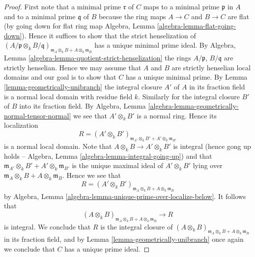 \documentclass[10pt,a4paper]{amsart}
\theoremstyle{plain}
\theoremstyle{definition}
\theoremstyle{remark}
\numberwithin{equation}{subsection}
\begin{document}
\begin{proof}
First note that a minimal prime $\mathfrak r$ of $C$ maps to a minimal
prime $\mathfrak p$ in $A$ and to a minimal prime $\mathfrak q$ of $B$
because the ring maps $A \to C$ and $B \to C$ are flat (by going down for
flat ring map Algebra, Lemma \ref{algebra-lemma-flat-going-down}).
Hence it suffices to show that the strict henselization of
$(A/\mathfrak p \otimes_k B/\mathfrak q)_{
\mathfrak m_A \otimes_k B + A \otimes_k \mathfrak m_B}$
has a unique minimal prime ideal. By
Algebra, Lemma \ref{algebra-lemma-quotient-strict-henselization}
the rings $A/\mathfrak p$, $B/\mathfrak q$ are strictly henselian.
Hence we may assume that $A$ and $B$ are strictly henselian
local domains and our goal is to show that $C$ has a unique minimal prime.
By Lemma \ref{lemma-geometrically-unibranch} the
integral closure $A'$ of $A$ in its fraction field
is a normal local domain with residue field $k$. Similarly for the
integral closure $B'$ of $B$ into its fraction field. By
Algebra, Lemma \ref{algebra-lemma-geometrically-normal-tensor-normal}
we see that $A' \otimes_k B'$ is a normal ring. Hence its localization
$$
R = (A' \otimes_k B')_{
\mathfrak m_{A'} \otimes_k B' + A' \otimes_k \mathfrak m_{B'}}
$$
is a normal local domain. Note that $A \otimes_k B \to A' \otimes_k B'$
is integral (hence gong up holds --
Algebra, Lemma \ref{algebra-lemma-integral-going-up})
and that $\mathfrak m_{A'} \otimes_k B' + A' \otimes_k \mathfrak m_{B'}$
is the unique maximal ideal of $A' \otimes_k B'$
lying over $\mathfrak m_A \otimes_k B + A \otimes_k \mathfrak m_B$.
Hence we see that
$$
R = (A' \otimes_k B')_{
\mathfrak m_A \otimes_k B + A \otimes_k \mathfrak m_B}
$$
by
Algebra, Lemma \ref{algebra-lemma-unique-prime-over-localize-below}.
It follows that
$$
(A \otimes_k B)_{
\mathfrak m_A \otimes_k B + A \otimes_k \mathfrak m_B}
\longrightarrow
R
$$
is integral. We conclude that $R$ is the integral closure of
$(A \otimes_k B)_{
\mathfrak m_A \otimes_k B + A \otimes_k \mathfrak m_B}$
in its fraction field, and by
Lemma \ref{lemma-geometrically-unibranch}
once again we conclude that $C$ has a unique prime ideal.
\end{proof}
\end{document}
